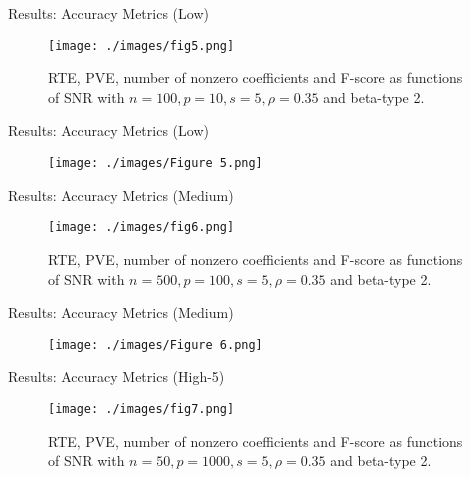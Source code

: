 \documentclass[blue, 10pt]{beamer}
\begin{document}
\begin{frame}{Results: Accuracy Metrics (Low)}

  \begin{figure}
    \centering
    \texttt{[image: ./images/fig5.png]}
    \caption{RTE, PVE, number of nonzero coefficients and F-score as functions of SNR with $n = 100, p = 10, s = 5, \rho = 0.35$ and beta-type 2.}
  \end{figure}

\end{frame}


\begin{frame}{Results: Accuracy Metrics (Low)}

  \begin{figure}
    \centering
    \texttt{[image: ./images/Figure 5.png]}
  \end{figure}

\end{frame}


\begin{frame}{Results: Accuracy Metrics (Medium)}

  \begin{figure}
    \centering
    \texttt{[image: ./images/fig6.png]}
    \caption{RTE, PVE, number of nonzero coefficients and F-score as functions of SNR with $n = 500, p = 100, s = 5, \rho = 0.35$ and beta-type 2.}
  \end{figure}

\end{frame}


\begin{frame}{Results: Accuracy Metrics (Medium)}

  \begin{figure}
    \centering
    \texttt{[image: ./images/Figure 6.png]}
  \end{figure}

\end{frame}


\begin{frame}{Results: Accuracy Metrics (High-5)}

  \begin{figure}
    \centering
    \texttt{[image: ./images/fig7.png]}
    \caption{RTE, PVE, number of nonzero coefficients and F-score as functions of SNR with $n = 50, p = 1000, s = 5, \rho = 0.35$ and beta-type 2.}
  \end{figure}

\end{frame}
\end{document}
